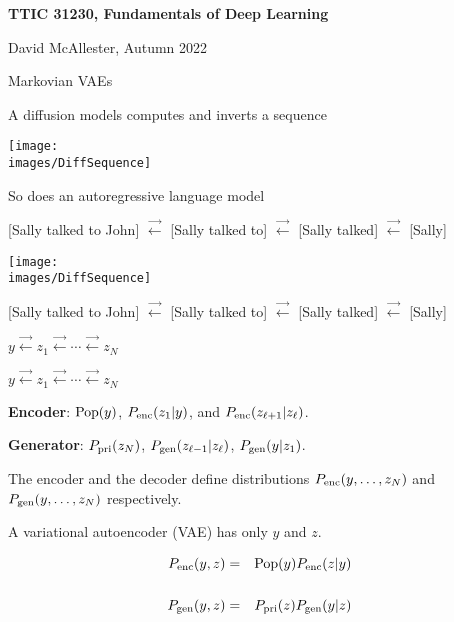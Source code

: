 





{\Huge

  \centerline{\bf TTIC 31230, Fundamentals of Deep Learning}
  \bigskip
  \centerline{David McAllester, Autumn 2022}
  \vfill
  \vfil
  \centerline{Markovian VAEs}
  \vfill
  \vfill


A diffusion models computes and inverts a sequence

\vfill
\centerline{\texttt{[image: \\images/DiffSequence]}}

\vfill
So does an autoregressive language model

\vfill
{\huge
\centerline{{\color{red} [Sally talked to John]} $\stackrel{\rightarrow}{\leftarrow}$ {\color{red} [Sally talked to]}
$\stackrel{\rightarrow}{\leftarrow}$ {\color{red}[Sally talked]} $\stackrel{\rightarrow}{\leftarrow}$ {\color{red}[Sally]}}
}




\centerline{\texttt{[image: \\images/DiffSequence]}}

\vfill
{\huge
\centerline{{\color{red} [Sally talked to John]} $\stackrel{\rightarrow}{\leftarrow}$ {\color{red} [Sally talked to]}
$\stackrel{\rightarrow}{\leftarrow}$ {\color{red}[Sally talked]} $\stackrel{\rightarrow}{\leftarrow}$ {\color{red}[Sally]}}
}

\vfill
\centerline{$y \stackrel{\rightarrow}{\leftarrow} z_1  \stackrel{\rightarrow}{\leftarrow} \cdots \stackrel{\rightarrow}{\leftarrow} z_N$}

\centerline{$y \stackrel{\rightarrow}{\leftarrow} z_1  \stackrel{\rightarrow}{\leftarrow} \cdots \stackrel{\rightarrow}{\leftarrow} z_N$}

\vfill
{\bf Encoder}: $\mathrm{Pop}(y)$, $P_{\mathrm{enc}}(z_1|y)$, and $P_{\mathrm{enc}}(z_{\ell+1}|z_\ell)$.


\vfill
{\bf Generator}: $P_{\mathrm{pri}}(z_N)$, $P_{\mathrm{gen}}(z_{\ell-1}|z_\ell)$, $P_{\mathrm{gen}}(y|z_1)$.

\vfill
The encoder and the decoder define distributions $P_{\mathrm{enc}}(y,\ldots,z_N)$ and $P_{\mathrm{gen}}(y,\ldots,z_N)$ respectively.


A variational autoencoder (VAE) has only $y$ and $z$.

\begin{eqnarray*}
P_{\mathrm{enc}}(y,z) & = & \mathrm{Pop}(y)P_{\mathrm{enc}}(z|y) \\
\\
P_{\mathrm{gen}}(y,z) & = & P_{\mathrm{pri}}(z)P_{\mathrm{gen}}(y|z)
\end{eqnarray*}


}
